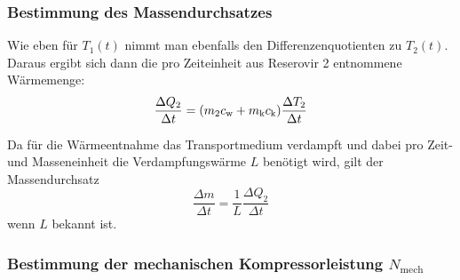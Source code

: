 \subsubsection{Bestimmung des Massendurchsatzes}

Wie eben für $T_1(t)$ nimmt man ebenfalls den Differenzenquotienten zu $T_2(t)$. Daraus 
ergibt sich dann die pro Zeiteinheit aus Reserovir 2 entnommene Wärmemenge:
\begin{equation}
	\frac{\Delta Q_2}{\Delta t}
	= (m_2 c_\text w + m_\text k c_\text k)  \frac{\Delta T_2}{\Delta t}
	\label{eqn:waermeleitung2}
\end{equation}

Da für die Wärmeentnahme das Transportmedium verdampft und dabei pro Zeit- und Masseneinheit die 
Verdampfungswärme $L$ benötigt wird, gilt der Massendurchsatz
\begin{equation}
	\frac{\Delta m}{\Delta t}
	=
	\frac{1}{L} \frac{\Delta Q_2}{\Delta t}
	\label{eqn:massendurchsatz}
\end{equation}
wenn $L$ bekannt ist.

\subsubsection{Bestimmung der mechanischen Kompressorleistung 
$N_\text{mech}$}

